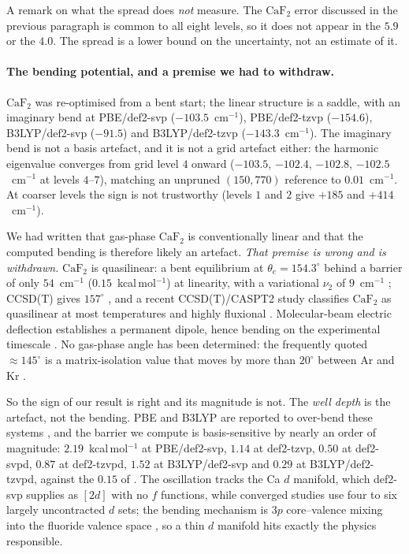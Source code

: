\documentclass[11pt,a4paper]{article}
\theoremstyle{plain}
\theoremstyle{definition}
\theoremstyle{remark}
\begin{document}
A remark on what the spread does \emph{not} measure. The $\mathrm{CaF_2}$ error
discussed in the previous paragraph is common to all eight levels, so it does not
appear in the $5.9$ or the $4.0$. The spread is a lower bound on the uncertainty,
not an estimate of it.

\paragraph{The bending potential, and a premise we had to withdraw.}
$\mathrm{CaF_2}$ was re-optimised from a bent start; the linear structure is a
saddle, with an imaginary bend at PBE/def2-svp ($-103.5$~cm$^{-1}$), PBE/def2-tzvp
($-154.6$), B3LYP/def2-svp ($-91.5$) and B3LYP/def2-tzvp ($-143.3$~cm$^{-1}$). The
imaginary bend is not a basis artefact, and it is not a grid artefact either: the
harmonic eigenvalue converges from grid level $4$ onward ($-103.5$, $-102.4$,
$-102.8$, $-102.5$~cm$^{-1}$ at levels $4$--$7$), matching an unpruned $(150,770)$
reference to $0.01$~cm$^{-1}$. At coarser levels the sign is not trustworthy
(levels $1$ and $2$ give $+185$ and $+414$~cm$^{-1}$).

We had written that gas-phase $\mathrm{CaF_2}$ is conventionally linear and that
the computed bending is therefore likely an artefact. \emph{That premise is wrong
and is withdrawn.} $\mathrm{CaF_2}$ is quasilinear: a bent equilibrium at
$\theta_e = 154.3^\circ$ behind a barrier of only $54$~cm$^{-1}$
($0.15$~kcal\,mol$^{-1}$) at linearity, with a variational $\nu_2$ of
$9$~cm$^{-1}$ \citep{Koput2004}; CCSD(T) gives $157^\circ$ \citep{Vasiliu2010}, and
a recent CCSD(T)/CASPT2 study classifies $\mathrm{CaF_2}$ as quasilinear at most
temperatures and highly fluxional \citep{Romeu2025}. Molecular-beam electric
deflection establishes a permanent dipole, hence bending on the experimental
timescale \citep{Wharton1963}. No gas-phase angle has been determined: the
frequently quoted $\approx145^\circ$ is a matrix-isolation value that moves by more
than $20^\circ$ between Ar and Kr \citep{Calder1969}.

So the sign of our result is right and its magnitude is not. The \emph{well depth}
is the artefact, not the bending. PBE and B3LYP are reported to over-bend these
systems \citep{Donald2006}, and the barrier we compute is basis-sensitive by nearly
an order of magnitude: $2.19$~kcal\,mol$^{-1}$ at PBE/def2-svp, $1.14$ at
def2-tzvp, $0.50$ at def2-svpd, $0.87$ at def2-tzvpd, $1.52$ at B3LYP/def2-svp and
$0.29$ at B3LYP/def2-tzvpd, against the $0.15$ of \citet{Koput2004}. The
oscillation tracks the Ca $d$ manifold, which def2-svp supplies as $[2d]$ with no
$f$ functions, while converged studies use four to six largely uncontracted $d$
sets; the bending mechanism is $3p$ core--valence mixing into the fluoride
valence space \citep{Romeu2025}, so a thin $d$ manifold hits exactly the physics
responsible.
\end{document}
